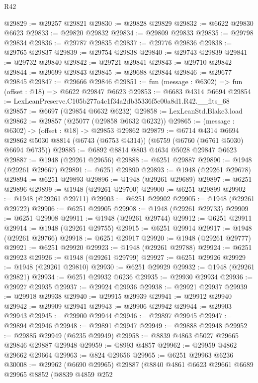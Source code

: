 \begin{lexlean}{R42}
\begin{coremodule}
{@29829 := @29257 @29821
@29830 := @29828 @29829
@29832 := @6622 @29830 @6623
@29833 := @29820 @29832
@29834 := @29809 @29833
@29835 := @29798 @29834
@29836 := @29787 @29835
@29837 := @29776 @29836
@29838 := @29765 @29837
@29839 := @29754 @29838
@29840 := @29743 @29839
@29841 := @29732 @29840
@29842 := @29721 @29841
@29843 := @29710 @29842
@29844 := @29699 @29843
@29845 := @29688 @29844
@29846 := @29677 @29845
@29847 := @29666 @29846
@29851 := fun (message : @6302) => fun (offset : @18) => @6622 @29847 @6623
@29853 := @6683 @4314 @6694
@29854 := LexLeanPreserve.C105b277a4c1f34a2db35336f5e00a8d1.R42.__fits_68
@29857 := @6697 (@29854 @6632 @6232)
@29858 := LexLeanStd.Blake3.load
@29862 := @29857 (@25077 (@29858 @6632 @6232))
@29865 := (message : @6302) -> (offset : @18) -> @29853 @29862
@29879 := @6714
    @4314
    @6694
    @29862
    @5030
    @8814
    (@6743 (@6753 @4314))
    (@6759 (@6760 (@6761 @5030) @6694 @6735))
@29885 := @6892 @8814 @803 @4634 @5028 @29847 @6623
@29887 := @1948 (@29261 @29656)
@29888 := @6251 @29887
@29890 := @1948 (@29261 @29667)
@29891 := @6251 @29890
@29893 := @1948 (@29261 @29678)
@29894 := @6251 @29893
@29896 := @1948 (@29261 @29689)
@29897 := @6251 @29896
@29899 := @1948 (@29261 @29700)
@29900 := @6251 @29899
@29902 := @1948 (@29261 @29711)
@29903 := @6251 @29902
@29905 := @1948 (@29261 @29722)
@29906 := @6251 @29905
@29908 := @1948 (@29261 @29733)
@29909 := @6251 @29908
@29911 := @1948 (@29261 @29744)
@29912 := @6251 @29911
@29914 := @1948 (@29261 @29755)
@29915 := @6251 @29914
@29917 := @1948 (@29261 @29766)
@29918 := @6251 @29917
@29920 := @1948 (@29261 @29777)
@29921 := @6251 @29920
@29923 := @1948 (@29261 @29788)
@29924 := @6251 @29923
@29926 := @1948 (@29261 @29799)
@29927 := @6251 @29926
@29929 := @1948 (@29261 @29810)
@29930 := @6251 @29929
@29932 := @1948 (@29261 @29821)
@29934 := @6251 @29932 @6236
@29935 := @29930 @29934
@29936 := @29927 @29935
@29937 := @29924 @29936
@29938 := @29921 @29937
@29939 := @29918 @29938
@29940 := @29915 @29939
@29941 := @29912 @29940
@29942 := @29909 @29941
@29943 := @29906 @29942
@29944 := @29903 @29943
@29945 := @29900 @29944
@29946 := @29897 @29945
@29947 := @29894 @29946
@29948 := @29891 @29947
@29949 := @29888 @29948
@29952 := @29885 @29949 (@6235 @29949)
@29958 := @8839 @4863 @5027 @29665 @29846 @29887 @29948
@29959 := @8993 @4857
@29962 := @29959 @4862 @29662 @29664
@29963 := @824 @29656
@29965 := @6251 @29963 @6236
@30008 := @29962
    (@6690 @29965)
    @29887
    (@8840
      @4861
      @6623
      @29661
      @6689
      @29965
      @8852
      (@8839
        @4859
        @252
}
\end{coremodule}
\end{lexlean}

